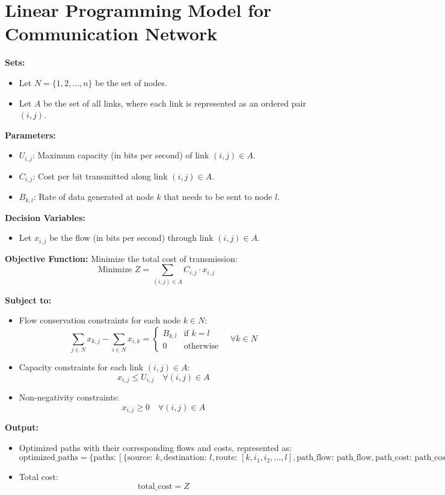 \documentclass{article}
\begin{document}
\section*{Linear Programming Model for Communication Network}

\textbf{Sets:}
\begin{itemize}
    \item Let $N = \{1, 2, \ldots, n\}$ be the set of nodes.
    \item Let $A$ be the set of all links, where each link is represented as an ordered pair $(i, j)$.
\end{itemize}

\textbf{Parameters:}
\begin{itemize}
    \item $U_{i,j}$: Maximum capacity (in bits per second) of link $(i, j) \in A$.
    \item $C_{i,j}$: Cost per bit transmitted along link $(i, j) \in A$.
    \item $B_{k,l}$: Rate of data generated at node $k$ that needs to be sent to node $l$.
\end{itemize}

\textbf{Decision Variables:}
\begin{itemize}
    \item Let $x_{i,j}$ be the flow (in bits per second) through link $(i, j) \in A$.
\end{itemize}

\textbf{Objective Function:} Minimize the total cost of transmission:
\[
\text{Minimize } Z = \sum_{(i,j) \in A} C_{i,j} \cdot x_{i,j}
\]

\textbf{Subject to:}
\begin{itemize}
    \item Flow conservation constraints for each node $k \in N$:
    \[
    \sum_{j \in N} x_{k,j} - \sum_{i \in N} x_{i,k} = \begin{cases}
        B_{k,l} & \text{if } k = l \\
        0 & \text{otherwise}
    \end{cases} \quad \forall k \in N
    \]

    \item Capacity constraints for each link $(i,j) \in A$:
    \[
    x_{i,j} \leq U_{i,j} \quad \forall (i,j) \in A
    \]

    \item Non-negativity constraints:
    \[
    x_{i,j} \geq 0 \quad \forall (i,j) \in A
    \]
\end{itemize}

\textbf{Output:}
\begin{itemize}
    \item Optimized paths with their corresponding flows and costs, represented as:
    \[
    \text{optimized\_paths} = \{ \text{paths}: [ \{ \text{source: } k, \text{destination: } l, \text{route: } [k, i_1, i_2, \ldots, l], \text{path\_flow: } \text{path\_flow}, \text{path\_cost: } \text{path\_cost} \} ] \}
    \]
    \item Total cost:
    \[
    \text{total\_cost} = Z
    \]
\end{itemize}
\end{document}
